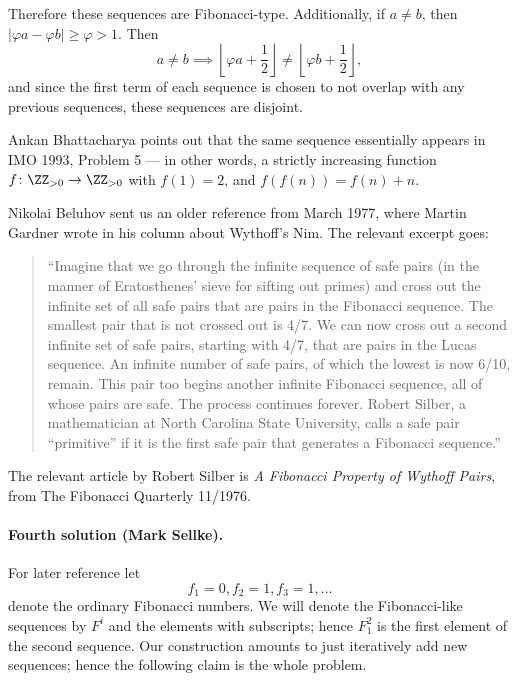 \documentclass[11pt]{scrartcl}
\begin{document}
Therefore these sequences are Fibonacci-type. Additionally, if $a \neq b$, then $|\varphi a - \varphi b| \ge \varphi > 1$. Then \[a \neq b \implies \left \lfloor \varphi a + \frac{1}{2} \right \rfloor \neq \left \lfloor \varphi b + \frac{1}{2} \right \rfloor,\]
and since the first term of each sequence is chosen to not overlap with any previous sequences, these sequences are disjoint.

\begin{remark*}
  Ankan Bhattacharya points out that the same sequence
  essentially appears in IMO 1993, Problem 5 --- in other words,
  a strictly increasing function $f \colon \ZZ_{>0} \to \ZZ_{>0}$ with $f(1) = 2$,
  and $f(f(n)) = f(n) + n$.

  Nikolai Beluhov sent us an older reference from March 1977,
  where Martin Gardner wrote in his column about Wythoff's Nim.
  The relevant excerpt goes:
  \begin{quote}
    ``Imagine that we go through the infinite sequence of safe pairs (in
    the manner of Eratosthenes' sieve for sifting out primes) and cross
    out the infinite set of all safe pairs that are pairs in the Fibonacci
    sequence. The smallest pair that is not crossed out is 4/7. We can now
    cross out a second infinite set of safe pairs, starting with 4/7, that
    are pairs in the Lucas sequence. An infinite number of safe pairs, of
    which the lowest is now 6/10, remain. This pair too begins another
    infinite Fibonacci sequence, all of whose pairs are safe. The process
    continues forever. Robert Silber, a mathematician at North Carolina
    State University, calls a safe pair ``primitive'' if it is the first
    safe pair that generates a Fibonacci sequence.''
  \end{quote}
  The relevant article by Robert Silber is
  \emph{A Fibonacci Property of Wythoff Pairs},
  from The Fibonacci Quarterly 11/1976.
\end{remark*}


\paragraph{Fourth solution (Mark Sellke).}
For later reference let \[ f_1=0, f_2=1, f_3=1, \dots \]
denote the ordinary Fibonacci numbers.
We will denote the Fibonacci-like sequences by $F^i$ and the elements with subscripts;
hence $F^2_1$ is the first element of the second sequence.
Our construction amounts to just iteratively add new sequences;
hence the following claim is the whole problem.
\end{document}
